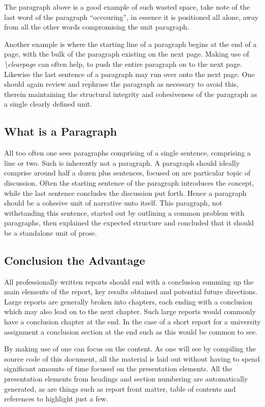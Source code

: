 The paragraph above is a good example of such wasted space, take note of the last word of the paragraph ``occouring'', in essence it is positioned all alone, away from all the other words compromising the unit paragraph. 

Another example is where the starting line of a paragraph begins at the end of a page, with the bulk of the paragraph existing on the next page. Making use of \emph{\textbackslash clearpage} can often help, to push the entire paragraph on to the next page. Likewise the last sentence of a paragraph may run over onto the next page. One should again review and rephrase the paragraph as necessary to avoid this, therein maintaining the structural integrity and cohesiveness of the paragraph as a single clearly defined unit. 

\subsection{What is a Paragraph}
All too often one sees paragraphs comprising of a single sentence, comprising a line or two. Such is inherently not a paragraph. A paragraph should ideally comprise around half a dozen plus sentences, focused on are particular topic of discussion. Often the starting sentence of the paragraph introduces the concept, while the last sentence concludes the discussion put forth. Hence a paragraph should be a cohesive unit of narrative unto itself. This paragraph, not withstanding this sentence, started out by outlining a common problem with paragraphs, then explained the expected structure and concluded that it should be a standalone unit of prose. 

\clearpage
\subsection{Conclusion the \latex Advantage}
All professionally written reports should end with a conclusion summing up the main elements of the report, key results obtained and potential future directions. Large reports are generally broken into chapters, each ending with a conclusion which may also lead on to the next chapter. Such large reports would commonly have a conclusion chapter at the end. In the case of a short report for a university assignment a conclusion section at the end such as this would be common to see. 

By making use of \latex one can focus on the content. As one will see by compiling the source code of this document, all the material is laid out without having to spend significant amounts of time focused on the presentation elements. All the presentation elements from headings and section numbering are automatically generated, as are things such as report front matter, table of contents and references to highlight just a few. 

